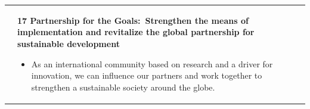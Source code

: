 \documentclass[../SustainableHEP.tex]{subfiles}
\begin{document}
\begin{longtable*}{l l}
\parbox[t]{\SDGleft\textwidth}{} & \parbox[t]{\SDGright\textwidth}{\textbf{17 Partnership for the Goals:\ Strengthen the means of implementation and revitalize the global partnership for sustainable development}
\begin{itemize}[leftmargin=20pt]
\item As an international community based on research and a driver for innovation, we can influence our partners and work together to strengthen a sustainable society around the globe.
\end{itemize}}

\end{longtable*}
\renewcommand*{\arraystretch}{1}
\end{document}
